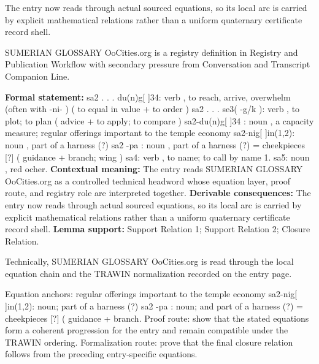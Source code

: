 The entry now reads through actual sourced equations, so its local arc is carried by explicit mathematical relations rather than a uniform quaternary certificate record shell.
\clearpage


\begingroup\small
{}
SUMERIAN GLOSSARY OoCities.org is a registry definition in Registry and Publication Workflow with secondary pressure from Conversation and Transcript Companion Line.

\begingroup\footnotesize\setlength{\emergencystretch}{3em}\sloppy
\textbf{Formal statement:} sa2 . . . du(n)g[ ]34: verb , to reach, arrive, overwhelm (often with -ni- ) ( to equal in value + to order ) sa2 . . . se3( -g/k ): verb , to plot; to plan ( advice + to apply; to compare ) sa2-du(n)g[ ]34 : noun , a capacity measure; regular offerings important to the temple economy sa2-nig[ ]in(1,2): noun , part of a harness (?) sa2 -pa : noun , part of a harness (?) = cheekpieces [?] ( guidance + branch; wing ) sa4: verb , to name; to call by name 1. sa5: noun , red ocher. \textbf{Contextual meaning:} The entry reads SUMERIAN GLOSSARY OoCities.org as a controlled technical headword whose equation layer, proof route, and registry role are interpreted together. \textbf{Derivable consequences:} The entry now reads through actual sourced equations, so its local arc is carried by explicit mathematical relations rather than a uniform quaternary certificate record shell. \textbf{Lemma support:} Support Relation 1; Support Relation 2; Closure Relation.\par
\endgroup

Technically, SUMERIAN GLOSSARY OoCities.org is read through the local equation chain and the TRAWIN normalization recorded on the entry page.

Equation anchors: regular offerings important to the temple economy sa2-nig[ ]in(1,2): noun; part of a harness (?) sa2 -pa : noun; and part of a harness (?) = cheekpieces [?] ( guidance + branch. Proof route: show that the stated equations form a coherent progression for the entry and remain compatible under the TRAWIN ordering. Formalization route: prove that the final closure relation follows from the preceding entry-specific equations.

